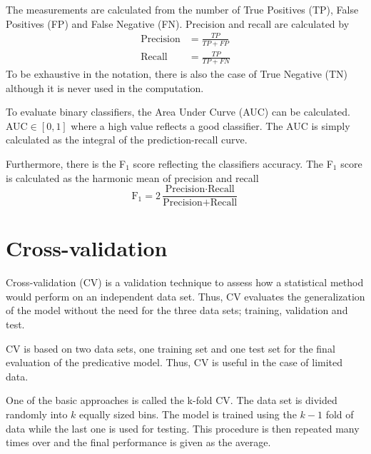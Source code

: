 The measurements are calculated from the number of True Positives (TP), False Positives (FP) and False Negative (FN). Precision and recall are calculated by \citep{powers2011}
\begin{align}
\text{Precision}&=\frac{TP}{TP+FP}\\
\text{Recall}&=\frac{TP}{TP+FN}
\end{align}
To be exhaustive in the notation, there is also the case of True Negative (TN) although it is never used in the computation.

To evaluate binary classifiers, the Area Under Curve (AUC) can be calculated. AUC$\in[0,1]$ where a high value reflects a good classifier. The AUC is simply calculated as the integral of the prediction-recall curve.

Furthermore, there is the F$_1$ score reflecting the classifiers accuracy. The F$_1$ score is calculated as the harmonic mean of precision and recall \citep{powers2011}
\begin{equation}
    \text{F}_1 = 2\frac{\text{Precision}\cdot \text{Recall}}{\text{Precision}+\text{Recall}}
\end{equation}

\section{Cross-validation}
Cross-validation (CV) is a validation technique to assess how a statistical method would perform on an independent data set. Thus, CV evaluates the generalization of the model without the need for the three data sets; training, validation and test.

CV is based on two data sets, one training set and one test set for the final evaluation of the predicative model. Thus, CV is useful in the case of limited data. 

One of the basic approaches is called the k-fold CV. The data set is divided randomly into $k$ equally sized bins. The model is trained using the $k-1$ fold of data while the last one is used for testing. This procedure is then repeated many times over and the final performance is given as the average.


